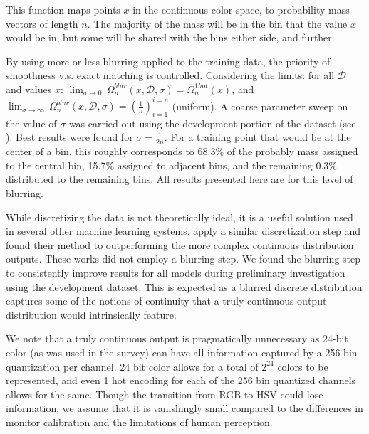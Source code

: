 \documentclass[11pt,a4paper]{article}
\newcommand{\compactmath}[1]{\noindent\resizebox{\columnwidth}{!}{$#1$}}
\newcommand{\textcite}{\citet}
\begin{document}
\compactmath{\Omega_{n}^{blur}(x,\mathcal{D},\sigma)=\left(P_{\mathcal{D}}\left(\dfrac{i-1}{n}<Y\le\dfrac{i}{n}\mid M=x,\,\Sigma=\sigma\right)\right)_{i=1}^{i=n}}
This function maps points $x$ in the continuous color-space, to probability mass vectors of length $n$.
The majority of the mass will be in the bin that the value $x$ would be in,
but some will be shared with the bins either side, and further.

By using more or less blurring applied to the training data, the priority of smoothness v.s. exact matching is controlled.
Considering the limits:
for all $\mathcal{D}$ and values $x$: 
\mbox{$\lim_{\sigma \to 0}\, \Omega_n^{blur}(x, \mathcal{D}, \sigma) = \Omega_n^{1hot}(x)$},
and \mbox{$\lim_{\sigma \to \infty}\, \Omega_n^{blur}(x, \mathcal{D}, \sigma) =  \left(\frac{1}{n}\right)_{i=1}^{i=n}$} (uniform).
A coarse parameter sweep on the value of $\sigma$ was carried out using the development portion of the dataset (see ).
Best results were found for $\sigma = \frac{1}{2n}$.
For a training point that would be at the center of a bin, this roughly corresponds to 68.3\% of the probably mass assigned to the central bin, 15.7\% assigned to adjacent bins, and the remaining 0.3\% distributed to the remaining bins.
All results presented here are for this level of blurring.

While discretizing the data is not theoretically ideal, it is a useful solution used in several other machine learning systems.
\textcite{oord2016pixel, DBLP:journals/corr/OordDZSVGKSK16} apply a similar discretization step and found their method to outperforming the more complex continuous distribution outputs.
These works did not employ a blurring-step.
We found the blurring step to consistently improve results for all models during preliminary investigation using the development dataset.
This is expected as a blurred discrete distribution captures some of the notions of continuity that a truly continuous output distribution would intrinsically feature.

We note that a truly continuous output is pragmatically unnecessary as 24-bit color (as was used in the survey) can have all information captured by a 256 bin quantization per channel.
24 bit color allows for a total of $2^{24}$ colors to be represented, and even 1 hot encoding for each of the 256 bin quantized channels allows for the same. Though the transition from RGB to HSV could lose information, we assume that it is vanishingly small compared to the differences in monitor calibration and the limitations of human perception.
\end{document}
